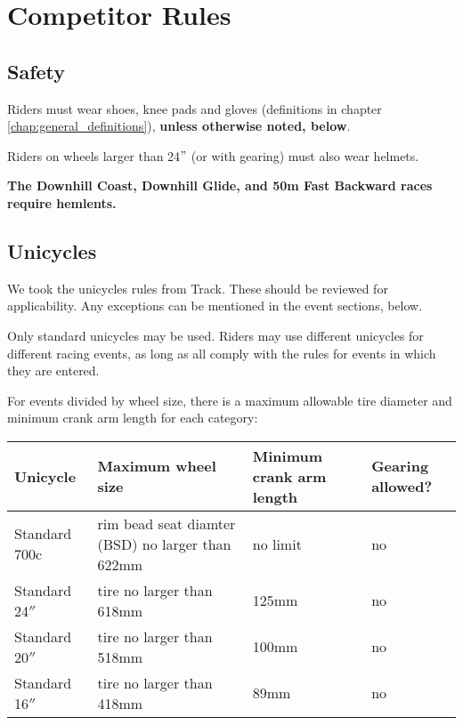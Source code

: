 \chapter{Competitor Rules}

\section{Safety}

Riders must wear shoes, knee pads and gloves (definitions in chapter \ref{chap:general_definitions}), \textbf{unless otherwise noted, below}.

Riders on wheels larger than 24$"$ (or with gearing) must also wear helmets.

\textbf{The Downhill Coast, Downhill Glide, and 50m Fast Backward races require hemlents.}

\section{Unicycles}

\begin{framed}
We took the unicycles rules from Track.  These should be reviewed for applicability.  Any exceptions can be mentioned in the event sections, below.
\end{framed}

Only standard unicycles may be used.
Riders may use different unicycles for different racing events, as long as all comply with the rules for events in which they are entered.

For events divided by wheel size, there is a maximum allowable tire diameter and minimum crank arm length for each category:

\begin{longtable}{|p{3cm}|p{5cm}|p{2cm}|p{2cm}|}
\hline
\textbf{Unicycle} & \textbf{Maximum wheel size} & \textbf{Minimum crank arm length} & \textbf{Gearing allowed?}\\
\hline
Standard 700c & rim bead seat diamter (BSD) 
no larger than 622mm & no limit & no \\
\hline
Standard 24$''$ & tire no larger than 618mm & 125mm & no \\
\hline
Standard 20$''$ & tire no larger than 518mm & 100mm & no \\
\hline
Standard 16$''$ & tire no larger than 418mm & 89mm & no \\
\hline
\end{longtable}

